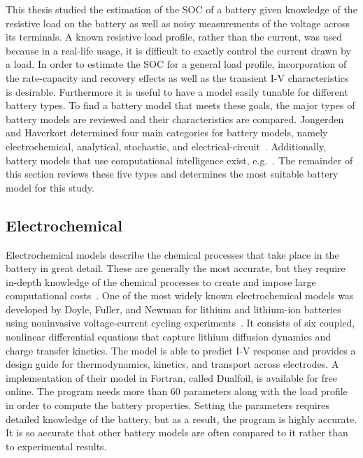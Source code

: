 \documentclass[../zhang_thesis.tex]{subfiles}
\begin{document}
This thesis studied the estimation of the SOC of a battery given knowledge of the resistive load on the battery as well as noisy measurements of the voltage across its terminals. A known resistive load profile, rather than the current, was used because in a real-life usage, it is difficult to exactly control the current drawn by a load. In order to estimate the SOC for a general load profile, incorporation of the rate-capacity and recovery effects as well as the transient I-V characteristics
is desirable. Furthermore it is useful to have a model easily tunable for different battery types. To find a battery model that meets these goals, the major types of battery models are reviewed and their characteristics are compared.
Jongerden and Haverkort determined four main categories for battery models, namely electrochemical, analytical, stochastic, and electrical-circuit~\cite{jongerden08}.
Additionally, battery models that use computational intelligence exist, e.g.~\cite{man12,ogorman98,capizzi11,wang06,shen02}.
The remainder of this section reviews these five types and determines the most suitable battery model for this study.

\subsection{Electrochemical}

Electrochemical models describe the chemical processes that take place in the battery in great detail. These are generally the most accurate, but they require in-depth knowledge of the chemical processes to create and impose large computational costs~\cite{jongerden09}. One of the most widely known electrochemical models was developed by Doyle, Fuller, and Newman for lithium and lithium-ion batteries using noninvasive voltage-current cycling
experiments~\cite{doyle93,fuller94,fuller94b}. It consists of six coupled, nonlinear differential equations that capture lithium diffusion dynamics and charge transfer kinetics. The model is able to predict I-V response and provides a design guide for thermodynamics, kinetics, and transport across electrodes. A implementation of their model in Fortran, called Dualfoil, is available for free online. The program needs more than 60 parameters along with the load profile
in order to compute the battery properties. Setting the parameters requires detailed knowledge of the battery, but as a result, the program is highly accurate. It is so accurate that other battery models are often compared to it rather than to experimental results.
\end{document}
